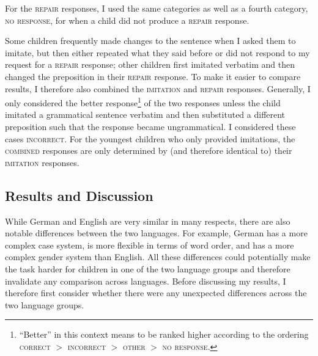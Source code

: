 \documentclass[lucida]{sp} %
\begin{document}
For the \textsc{repair} responses, I used the same categories as well as a fourth category, \textsc{no response}, for when a child did not produce a \textsc{repair} response.

Some children frequently made changes to the sentence when I asked them to imitate, but then either repeated what they said before or did not respond to my request for a \textsc{repair} response;  other children first imitated verbatim and then changed the preposition in their \textsc{repair} response. To make it easier to compare results, I therefore also combined the \textsc{imitation} and \textsc{repair} responses. Generally, I only considered the better response\footnote{``Better'' in this context means to be ranked higher according to the ordering \textsc{correct} $>$ \textsc{incorrect} $>$ \textsc{other} $>$ \textsc{no response}.} of the two responses unless the child imitated a grammatical sentence verbatim and then substituted a different preposition such that the response became ungrammatical. I considered these cases \textsc{incorrect}. For the youngest children who only provided imitations, the \textsc{combined} responses are only determined by (and therefore identical to) their \textsc{imitation} responses.


\subsection{Results and Discussion}




While German and English are very similar in many respects, there are also notable differences between the two languages. For example, German has a more complex case system, is more flexible in terms of word order, and has a more complex gender system than English. All these differences could potentially make the task harder for children in one of the two language groups and therefore invalidate any comparison across languages. Before discussing my results, I therefore first consider whether there were any unexpected differences across the two language groups.
\end{document}
